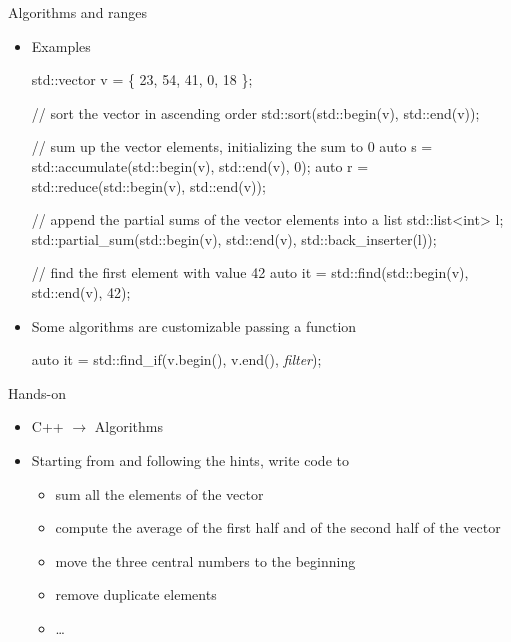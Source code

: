 \begin{frame}[fragile]{Algorithms and ranges}

  \begin{itemize}
  \item Examples
    \begin{codeblock}
std::vector v = \{ 23, 54, 41, 0, 18 \};

// sort the vector in ascending order
std::sort(std::begin(v), std::end(v));

// sum up the vector elements, initializing the sum to 0
auto s = std::accumulate(std::begin(v), std::end(v), 0);
auto r = std::reduce(std::begin(v), std::end(v));

// append the partial sums of the vector elements into a list
std::list<int> l;
std::partial\_sum(std::begin(v), std::end(v), std::back\_inserter(l));

// find the first element with value 42
auto it = std::find(std::begin(v), std::end(v), 42);
    \end{codeblock}

  \item Some algorithms are customizable passing a function
    \begin{codeblock}
auto it = std::find_if(v.begin(), v.end(), \alert{\textit{filter}});\end{codeblock}
  \end{itemize}
\end{frame}

\begin{frame}{Hands-on}
  \begin{itemize}
  \item C++ $\rightarrow$ Algorithms
  \item Starting from  and following the hints, write code to
    \begin{itemize}
    \item sum all the elements of the vector
    \item compute the average of the first half and of the second half of the
      vector
    \item move the three central numbers to the beginning
    \item remove duplicate elements
    \item \ldots
    \end{itemize}
  \end{itemize}
\end{frame}

